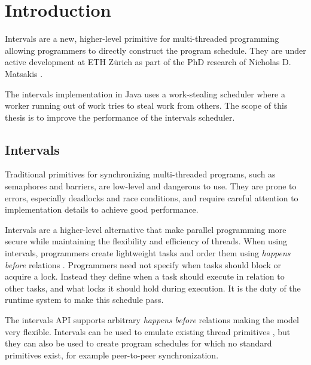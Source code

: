 
\chapter{Introduction}
\label{chap:introduction}

Intervals \cite{Matsakis2009a} are a new, higher-level primitive for
multi-threaded programming allowing programmers to directly construct
the program schedule. They are under active development at ETH Zürich
as part of the PhD research of Nicholas D. Matsakis
\cite{Matsakis2010}.

The intervals implementation in Java uses a work-stealing scheduler
where a worker running out of work tries to steal work from
others. The scope of this thesis is to improve the performance of the
intervals scheduler.


\section{Intervals}
\label{sec:intro-intervals}

Traditional primitives for synchronizing multi-threaded programs, such
as semaphores and barriers, are low-level and dangerous to use. They
are prone to errors, especially deadlocks and race conditions, and
require careful attention to implementation details to achieve good
performance.


Intervals are a higher-level alternative that make parallel
programming more secure while maintaining the flexibility and
efficiency of threads. When using intervals, programmers create
lightweight tasks and order them using \emph{happens before} relations
\cite{Lamport1978}. Programmers need not specify when tasks should
block or acquire a lock. Instead they define when a task should
execute in relation to other tasks, and what locks it should hold
during execution. It is the duty of the runtime system to make this
schedule pass.

The intervals API supports arbitrary \emph{happens before} relations
making the model very flexible. Intervals can be used to emulate
existing thread primitives \cite{Matsakis2009a}, but they can also be
used to create program schedules for which no standard primitives
exist, for example peer-to-peer synchronization.

